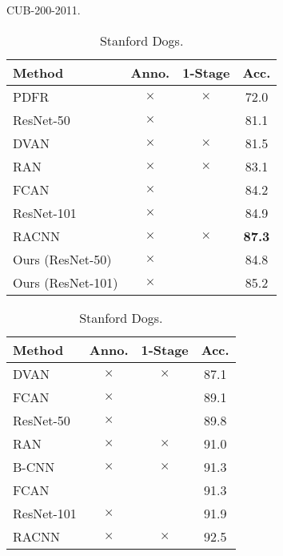 \documentclass[runningheads]{llncs}
\begin{document}
\begin{table}[p]
\begin{minipage}[p]{0.48\linewidth}
\begin{subtable}[t]{\textwidth}
      \caption{CUB-200-2011.} \label{table:results_cub}
    \end{subtable}
      \begin{subtable}[t]{\textwidth}
  	\begin{tabular}{lccc}
	\toprule
          Method & Anno. & 1-Stage & Acc.\\
	\midrule
	PDFR \cite{zhang2016picking} & $\times$ & $\times$ & 72.0\\
	ResNet-50 \cite{he2016deep} & $\times$ & \checkmark & 81.1\\
	DVAN \cite{zhao2016diversified} & $\times$ & $\times$ & 81.5\\
	RAN \cite{wang2017residual} & $\times$ & $\times$ & 83.1\\
	FCAN \cite{liu2016fully} & $\times$ & \checkmark & 84.2\\
	ResNet-101 \cite{he2016deep} & $\times$ & \checkmark & 84.9\\
	RACNN \cite{fu2017look} & $\times$ & $\times$ & \bf87.3\\
	\midrule
	Ours (ResNet-50) & $\times$ & \checkmark & 84.8\\
	Ours (ResNet-101) & $\times$ & \checkmark & 85.2\\
	\bottomrule
	\end{tabular}
        \caption{Stanford Dogs.}
        \label{table:results_stanford_dogs}
      \end{subtable}
 \end{minipage}
 \begin{minipage}[p]{0.48\linewidth}
      \centering
      \begin{subtable}[t]{\textwidth}
	\begin{tabular}{lccc}
	\toprule
         Method & Anno. & 1-Stage & Acc.\\
	\midrule
	DVAN \cite{zhao2016diversified} & $\times$ & $\times$ & 87.1\\
	FCAN \cite{liu2016fully} & $\times$ & \checkmark & 89.1\\
	ResNet-50 \cite{he2016deep} & $\times$ & \checkmark & 89.8\\
	RAN \cite{wang2017residual} & $\times$ & $\times$ & 91.0\\
	B-CNN \cite{lin2015bilinear} & $\times$ & $\times$ & 91.3\\
	FCAN \cite{liu2016fully} & \checkmark & \checkmark & 91.3\\
	ResNet-101 \cite{he2016deep} & $\times$ & \checkmark & 91.9\\
	RACNN \cite{fu2017look} & $\times$ & $\times$ & 92.5\\

\end{tabular}
\end{subtable}
\end{minipage}
\end{table}
\end{document}

